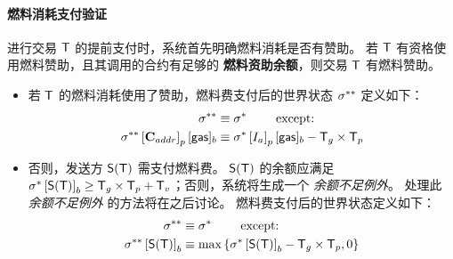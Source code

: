 \paragraph{燃料消耗支付验证}

进行交易 $\textsf{T}$ 的提前支付时，系统首先明确燃料消耗是否有赞助。
若 $\textsf{T}$ 有资格使用燃料赞助，且其调用的合约有足够的 \textbf{燃料资助余额}，则交易 $\textsf{T}$ 有燃料赞助。
\begin{itemize}
	\item 若 $\textsf{T}$ 的燃料消耗使用了赞助，燃料费支付后的世界状态 $\mathbf{\sigma}^{**}$ 定义如下：
	\begin{align}
		\mathbf{\sigma}^{**}  &\equiv \mathbf{\sigma}^* \qquad \mbox{  except:}\\
		\mathbf{\sigma}^{**}\left[\mathbf{C}_{addr}\right]_p[{\sf gas}]_b &\equiv \mathbf{\sigma}^*\left[I_a\right]_p[{\sf gas}]_b-\textsf{T}_g\times\textsf{T}_p
	\end{align} 
	
	\item 否则，发送方 $\mathsf{S}{\left({\textsf{T}} \right)}$ 需支付燃料费。
	$\mathsf{S}{\left({\textsf{T}} \right)}$ 的余额应满足 $\mathbf{\sigma}^{*} \left[\mathsf{S}{\left({\textsf{T}} \right)}\right]_b \ge \textsf{T}_g\times\textsf{T}_p+\textsf{T}_v$；否则，系统将生成一个 \emph{余额不足例外}。
	处理此 \emph{余额不足例外} 的方法将在之后讨论。
	燃料费支付后的世界状态定义如下：
	\begin{align}
		\mathbf{\sigma}^{**}  &\equiv \mathbf{\sigma}^* \qquad \mbox{  except:}\\
		\mathbf{\sigma}^{**} \left[\mathsf{S}{\left({\textsf{T}} \right)}\right]_b &\equiv \max{\left \{{\ensuremath{\mathbf{\sigma}}^*\left[\ensuremath{\mathsf{S}{\left({\textsf{T}} \right)}}\right]_b-\textsf{T}_g\times\textsf{T}_p,0} \right \}}
	\end{align}
\end{itemize}

